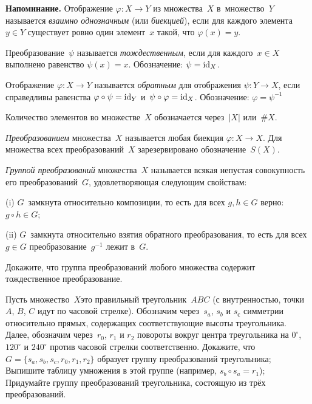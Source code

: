 \documentclass[a4paper,12pt]{article}
\newenvironment{напоминание}{\medskip\textbf{Напоминание.}}{\par}
\begin{document}

\begin{напоминание}
Отображение $\varphi\colon X\to Y$ из множества~$X$ в~множество~$Y$ называется \emph{взаимно однозначным} (или \emph{биекцией}), если для каждого элемента $y\in Y$ существует ровно один элемент~$x$ такой, что $\varphi(x)=y$.\par
Преобразование~$\psi$ называется \emph{тождественным}, если для каждого~$x\in X$ выполнено равенство $\psi(x)=x$. Обозначение: $\psi=\operatorname{id}_X$.\par
Отображение $\varphi\colon X\to Y$ называется \emph{обратным} для отображения $\psi\colon Y\to X$, если справедливы равенства $\varphi\circ\psi=\operatorname{id}_Y$ и~$\psi\circ\varphi=\operatorname{id}_X$. Обозначение: $\varphi=\psi^{-1}$\par
Количество элементов во множестве~$X$ обозначается через~$|X|$ или~$\#X$.
\end{напоминание}

\emph{Преобразованием} множества~$X$ называется любая биекция $\varphi\colon X\to X$. Для множества всех преобразований~$X$ зарезервировано обозначение~$S(X)$.

\emph{Группой преобразований} множества~$X$ называется всякая непустая совокупность его преобразований~$G$, удовлетворяющая следующим свойствам:
\begin{items}{-5}
\item[(i)]
$G$~замкнута относительно композиции, то есть для всех $g,h\in G$ верно: $g\circ h\in G$;
\item[(ii)]
$G$~замкнута относительно взятия обратного преобразования, то есть для всех $g\in G$  преобразование~$g^{-1}$ лежит в~$G$.
\end{items}
\vspace*{-3mm}

Докажите, что группа преобразований любого множества содержит тождественное преобразование.



\label{triangle}
Пусть множество~$X$\т это правильный треугольник~$ABC$ (с внутренностью, точки $A$, $B$, $C$ идут по часовой стрелке).
Обозначим через~$s_{a}$, $s_{b}$ и $s_с$ симметрии относительно прямых,
содержащих соответствующие высоты треугольника.
Далее, обозначим через~$r_0$, $r_1$ и $r_2$ повороты вокруг центра треугольника на $0^\circ$, $120^\circ$ и $240^\circ$ против часовой стрелки соответственно.
Докажите, что $G=\{s_{a},s_{b},s_{c},r_0,r_1,r_2\}$ образует группу преобразований треугольника;
Выпишите таблицу умножения в этой группе (например, $s_b\circ s_a = r_1$);
Придумайте группу преобразований треугольника, состоящую из трёх преобразований.
\end{document}
